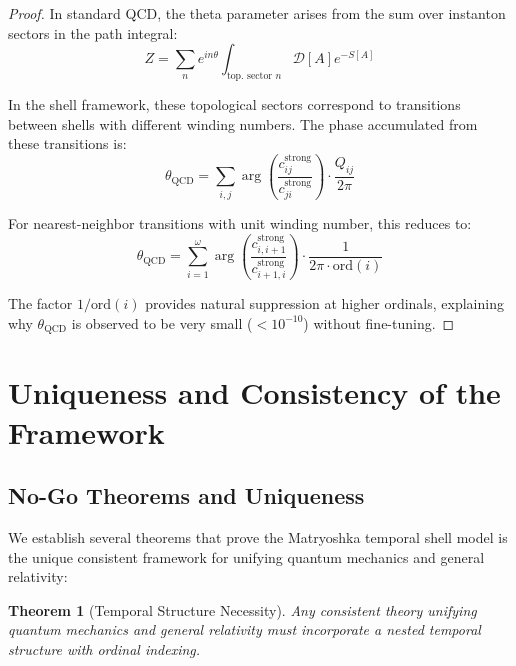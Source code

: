 \documentclass[12pt,a4paper]{article}
\newtheorem{theorem}{Theorem}[section]
\newcommand{\ord}{\text{ord}}
\begin{document}
\begin{proof}
In standard QCD, the theta parameter arises from the sum over instanton sectors in the path integral:
\begin{equation}
Z = \sum_n e^{in\theta} \int_{\text{top. sector }n} \mathcal{D}[A] e^{-S[A]}
\end{equation}

In the shell framework, these topological sectors correspond to transitions between shells with different winding numbers. The phase accumulated from these transitions is:
\begin{equation}
\theta_{\text{QCD}} = \sum_{i,j} \arg\left(\frac{c_{ij}^{\text{strong}}}{c_{ji}^{\text{strong}}}\right) \cdot \frac{Q_{ij}}{2\pi}
\end{equation}

For nearest-neighbor transitions with unit winding number, this reduces to:
\begin{equation}
\theta_{\text{QCD}} = \sum_{i=1}^{\omega} \arg\left(\frac{c_{i,i+1}^{\text{strong}}}{c_{i+1,i}^{\text{strong}}}\right) \cdot \frac{1}{2\pi \cdot \ord(i)}
\end{equation}

The factor $1/\ord(i)$ provides natural suppression at higher ordinals, explaining why $\theta_{\text{QCD}}$ is observed to be very small ($<10^{-10}$) without fine-tuning.
\end{proof}

\section{Uniqueness and Consistency of the Framework}
\label{sec:uniqueness}

\subsection{No-Go Theorems and Uniqueness}
\label{subsec:no-go}

We establish several theorems that prove the Matryoshka temporal shell model is the unique consistent framework for unifying quantum mechanics and general relativity:

\begin{theorem}[Temporal Structure Necessity]
\label{thm:temporal-necessity}
Any consistent theory unifying quantum mechanics and general relativity must incorporate a nested temporal structure with ordinal indexing.
\end{theorem}
\end{document}
